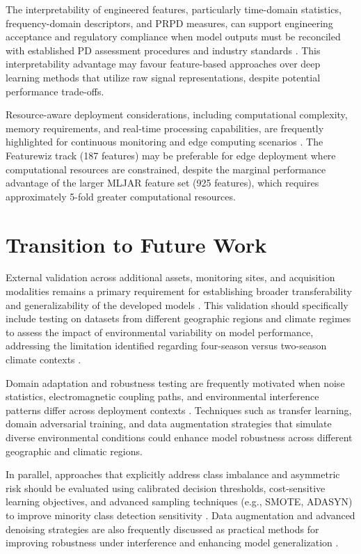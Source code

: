 The interpretability of engineered features, particularly time-domain statistics, frequency-domain descriptors, and PRPD measures, can support engineering acceptance and regulatory compliance when model outputs must be reconciled with established PD assessment procedures and industry standards \parencite{Aldosari_2023, Vera_2023_1}. This interpretability advantage may favour feature-based approaches over deep learning methods that utilize raw signal representations, despite potential performance trade-offs.

Resource-aware deployment considerations, including computational complexity, memory requirements, and real-time processing capabilities, are frequently highlighted for continuous monitoring and edge computing scenarios \parencite{Klein_2024_1, Sikorski_2025}. The Featurewiz track (187 features) may be preferable for edge deployment where computational resources are constrained, despite the marginal performance advantage of the larger MLJAR feature set (925 features), which requires approximately 5-fold greater computational resources.

\section{Transition to Future Work}

External validation across additional assets, monitoring sites, and acquisition modalities remains a primary requirement for establishing broader transferability and generalizability of the developed models \parencite{Seitz_2024_1, Sikorski_2025}. This validation should specifically include testing on datasets from different geographic regions and climate regimes to assess the impact of environmental variability on model performance, addressing the limitation identified regarding four-season versus two-season climate contexts \parencite{Raymond_2022, Azam_2024}.

Domain adaptation and robustness testing are frequently motivated when noise statistics, electromagnetic coupling paths, and environmental interference patterns differ across deployment contexts \parencite{Raymond_2022, Friebe_2024}. Techniques such as transfer learning, domain adversarial training, and data augmentation strategies that simulate diverse environmental conditions could enhance model robustness across different geographic and climatic regions.

In parallel, approaches that explicitly address class imbalance and asymmetric risk should be evaluated using calibrated decision thresholds, cost-sensitive learning objectives, and advanced sampling techniques (e.g., SMOTE, ADASYN) to improve minority class detection sensitivity \parencite{Zemouri_2023_1, Adhikari_2024}. Data augmentation and advanced denoising strategies are also frequently discussed as practical methods for improving robustness under interference and enhancing model generalization \parencite{Bao_2024_1, Friebe_2024}.

